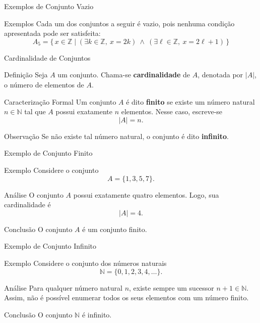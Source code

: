 \documentclass[9pt]{beamer}
\begin{document}
\begin{frame}{Exemplos de Conjunto Vazio}

\begin{block}{Exemplos}
Cada um dos conjuntos a seguir é vazio, pois nenhuma condição apresentada pode ser satisfeita:
\[
A_5 = \{\, x \in \mathbb{Z} \mid (\exists k \in \mathbb{Z},\ x = 2k)\ \land\ (\exists \ell \in \mathbb{Z},\ x = 2\ell + 1) \,\}
\]
\end{block}

\end{frame}
\begin{frame}{Cardinalidade de Conjuntos}

\begin{block}{Definição}
Seja $A$ um conjunto. Chama-se \textbf{cardinalidade} de $A$,
denotada por $|A|$, o número de elementos de $A$.
\end{block}

\begin{block}{Caracterização Formal}
Um conjunto $A$ é dito \textbf{finito} se existe um número natural $n \in \mathbb{N}$
tal que $A$ possui exatamente $n$ elementos.
Nesse caso, escreve-se
\[
|A| = n.
\]
\end{block}

\begin{block}{Observação}
Se não existe tal número natural, o conjunto é dito \textbf{infinito}.
\end{block}

\end{frame}
\begin{frame}{Exemplo de Conjunto Finito}

\begin{block}{Exemplo}
Considere o conjunto
\[
A = \{1, 3, 5, 7\}.
\]
\end{block}

\begin{block}{Análise}
O conjunto $A$ possui exatamente quatro elementos.
Logo, sua cardinalidade é
\[
|A| = 4.
\]
\end{block}

\begin{block}{Conclusão}
O conjunto $A$ é um conjunto finito.
\end{block}

\end{frame}
    \begin{frame}{Exemplo de Conjunto Infinito}

\begin{block}{Exemplo}
Considere o conjunto dos números naturais
\[
\mathbb{N} = \{0, 1, 2, 3, 4, \dots\}.
\]
\end{block}

\begin{block}{Análise}
Para qualquer número natural $n$, existe sempre um sucessor $n+1 \in \mathbb{N}$.
Assim, não é possível enumerar todos os seus elementos com um número finito.
\end{block}

\begin{block}{Conclusão}
O conjunto $\mathbb{N}$ é infinito.
\end{block}

\end{frame}
\end{document}
